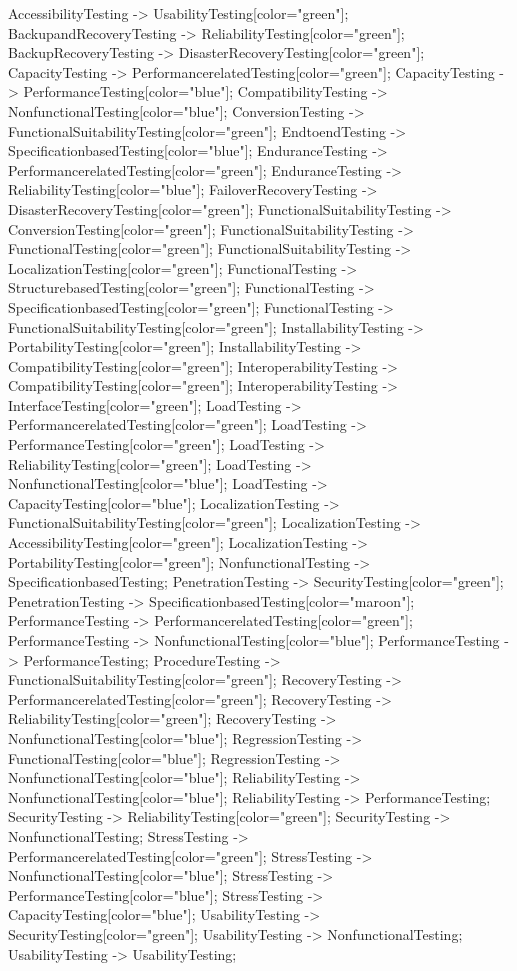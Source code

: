 \documentclass{article}
\begin{document}
{AccessibilityTesting -> UsabilityTesting[color="green"];
BackupandRecoveryTesting -> ReliabilityTesting[color="green"];
BackupRecoveryTesting -> DisasterRecoveryTesting[color="green"];
CapacityTesting -> PerformancerelatedTesting[color="green"];
CapacityTesting -> PerformanceTesting[color="blue"];
CompatibilityTesting -> NonfunctionalTesting[color="blue"];
ConversionTesting -> FunctionalSuitabilityTesting[color="green"];
EndtoendTesting -> SpecificationbasedTesting[color="blue"];
EnduranceTesting -> PerformancerelatedTesting[color="green"];
EnduranceTesting -> ReliabilityTesting[color="blue"];
FailoverRecoveryTesting -> DisasterRecoveryTesting[color="green"];
FunctionalSuitabilityTesting -> ConversionTesting[color="green"];
FunctionalSuitabilityTesting -> FunctionalTesting[color="green"];
FunctionalSuitabilityTesting -> LocalizationTesting[color="green"];
FunctionalTesting -> StructurebasedTesting[color="green"];
FunctionalTesting -> SpecificationbasedTesting[color="green"];
FunctionalTesting -> FunctionalSuitabilityTesting[color="green"];
InstallabilityTesting -> PortabilityTesting[color="green"];
InstallabilityTesting -> CompatibilityTesting[color="green"];
InteroperabilityTesting -> CompatibilityTesting[color="green"];
InteroperabilityTesting -> InterfaceTesting[color="green"];
LoadTesting -> PerformancerelatedTesting[color="green"];
LoadTesting -> PerformanceTesting[color="green"];
LoadTesting -> ReliabilityTesting[color="green"];
LoadTesting -> NonfunctionalTesting[color="blue"];
LoadTesting -> CapacityTesting[color="blue"];
LocalizationTesting -> FunctionalSuitabilityTesting[color="green"];
LocalizationTesting -> AccessibilityTesting[color="green"];
LocalizationTesting -> PortabilityTesting[color="green"];
NonfunctionalTesting -> SpecificationbasedTesting;
PenetrationTesting -> SecurityTesting[color="green"];
PenetrationTesting -> SpecificationbasedTesting[color="maroon"];
PerformanceTesting -> PerformancerelatedTesting[color="green"];
PerformanceTesting -> NonfunctionalTesting[color="blue"];
PerformanceTesting -> PerformanceTesting;
ProcedureTesting -> FunctionalSuitabilityTesting[color="green"];
RecoveryTesting -> PerformancerelatedTesting[color="green"];
RecoveryTesting -> ReliabilityTesting[color="green"];
RecoveryTesting -> NonfunctionalTesting[color="blue"];
RegressionTesting -> FunctionalTesting[color="blue"];
RegressionTesting -> NonfunctionalTesting[color="blue"];
ReliabilityTesting -> NonfunctionalTesting[color="blue"];
ReliabilityTesting -> PerformanceTesting;
SecurityTesting -> ReliabilityTesting[color="green"];
SecurityTesting -> NonfunctionalTesting;
StressTesting -> PerformancerelatedTesting[color="green"];
StressTesting -> NonfunctionalTesting[color="blue"];
StressTesting -> PerformanceTesting[color="blue"];
StressTesting -> CapacityTesting[color="blue"];
UsabilityTesting -> SecurityTesting[color="green"];
UsabilityTesting -> NonfunctionalTesting;
UsabilityTesting -> UsabilityTesting;

}
\end{document}

